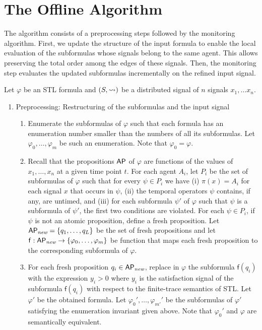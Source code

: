 \section{The Offline Algorithm}
The algorithm consists of a preprocessing steps followed by the monitoring algorithm.
First, we update the structure of the input formula to enable the local evaluation of the subformulas whose signals belong to the same agent.
This allows preserving the total order among the edges of these signals.
Then, the monitoring step evaluates the updated subformulas incrementally on the refined input signal.

Let $\varphi$ be an STL formula and $(S,{\rightsquigarrow})$ be a distributed signal of $n$ signals $x_1, \ldots x_n$.

\begin{enumerate}
	\item Preprocessing: Restructuring of the subformulas and the input signal
	\begin{enumerate}[label=\arabic*.]
		\item
		Enumerate the subformulas of $\varphi$ such that each formula has an enumeration number smaller than the numbers of all its subformulas.
		Let $\varphi_0, \ldots, \varphi_m$ be such an enumeration.
		Note that $\varphi_0 = \varphi$.
		
		\item
		Recall that the propositions $\mathsf{AP}$ of $\varphi$ are functions of the values of $x_1, \ldots, x_n$ at a given time point $t$.
		For each agent $A_i$, let $P_i$ be the set of subformulas of $\varphi$ such that for every $\psi \in P_i$ we have
		(i) $\pi(x) = A_i$ for each signal $x$ that occurs in $\psi$,
		(ii) the temporal operators $\psi$ contains, if any, are untimed, and
		(iii) for each subformula $\psi'$ of $\varphi$ such that $\psi$ is a subformula of $\psi'$, the first two conditions are violated.
		For each $\psi \in P_i$, if $\psi$ is not an atomic proposition, define a fresh proposition.
		Let $\mathsf{AP}_{\textit{new}} = \{q_1, \ldots, q_L\}$ be the set of fresh propositions and let $\mathsf{f} : \mathsf{AP}_{\textit{new} }\to \{\varphi_0, \ldots, \varphi_m\}$ be function that maps each fresh proposition to the corresponding subformula of $\varphi$.
		
		\item
		For each fresh proposition $q_i \in \mathsf{AP}_{\textit{new}}$, replace in $\varphi$ the subformula $\mathsf{f}(q_i)$ with the expression $y_i > 0$ where $y_i$ is the satisfaction signal of the subformula $\mathsf{f}(q_i)$ \alert{with respect to the finite-trace semantics of STL}.
		Let $\varphi'$ be the obtained formula.
		Let $\varphi_0', \ldots, \varphi_{m'}'$ be the subformulas of $\varphi'$ satisfying the enumeration invariant given above.
		Note that $\varphi_0'$  and $\varphi$ are semantically equivalent. %
		

\end{enumerate}
\end{enumerate}
